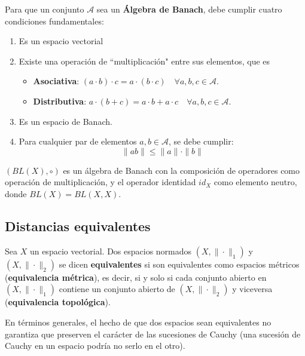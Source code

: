 \documentclass[12pt]{book}
\newcommand{\tbf}{\textbf}
\begin{document}
\begin{definicion}
    Para que un conjunto $\mathcal{A}$ sea un \tbf{Álgebra de Banach}, debe cumplir cuatro condiciones fundamentales:
    \begin{enumerate}
        \item Es un espacio vectorial
        \item Existe una operación de ``multiplicación" entre sus elementos, que es 
        \begin{itemize}
            \item \tbf{Asociativa}: $(a \cdot b) \cdot c = a \cdot (b \cdot c)\quad \forall a, b, c \in \mathcal{A}$.
            \item \textbf{Distributiva}: $a \cdot (b + c) = a \cdot b + a \cdot c \quad \forall a, b, c \in \mathcal{A}$.
        \end{itemize}
        \item Es un espacio de Banach.
        \item Para cualquier par de elementos $a, b \in \mathcal{A}$, se debe cumplir:$$\|ab\| \leq \|a\| \cdot \|b\|$$
    \end{enumerate}
\end{definicion}

\begin{observacion}
    $(BL(X), \circ)$ es un álgebra de Banach con la composición de operadores como operación de multiplicación, y el operador identidad $id_X$ como elemento neutro, donde \mbox{$BL(X)=BL(X,X)$}.
\end{observacion}


\subsection{Distancias equivalentes}


\begin{definicion}
    Sea $X$ un espacio vectorial. Dos espacios normados $(X, \|\cdot\|_1)$ y $(X, \|\cdot\|_2)$ se dicen \textbf{equivalentes} si son equivalentes como espacios métricos (\tbf{equivalencia métrica}), es decir, si y solo si cada conjunto abierto en $(X, \|\cdot\|_1)$ contiene un conjunto abierto de $(X, \|\cdot\|_2)$ y viceversa (\tbf{equivalencia topológica}).
\end{definicion}

\begin{observacion}
    En términos generales, el hecho de que dos espacios sean equivalentes no garantiza que preserven el carácter de las sucesiones de Cauchy (una sucesión de Cauchy en un espacio podría no serlo en el otro). \\
\end{observacion}
\end{document}

